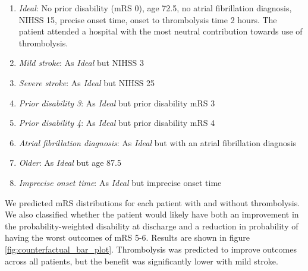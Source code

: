 \begin{enumerate}
    \item \textit{Ideal}: No prior disability (mRS 0), age 72.5, no atrial fibrillation diagnosis, NIHSS 15, precise onset time, onset to thrombolysis time 2 hours. The patient attended a hospital with the most neutral contribution towards use of thrombolysis.
    \item \textit{Mild stroke}: As \textit{Ideal} but NIHSS 3
    \item \textit{Severe stroke}: As \textit{Ideal} but NIHSS 25
    \item \textit{Prior disability 3}: As \textit{Ideal} but prior disability mRS 3
    \item \textit{Prior disability 4}:  As \textit{Ideal} but prior disability mRS 4
    \item \textit{Atrial fibrillation diagnosis}: As \textit{Ideal} but with an atrial fibrillation diagnosis
    \item \textit{Older}: As \textit{Ideal} but age 87.5
    \item \textit{Imprecise onset time}: As \textit{Ideal} but imprecise onset time
\end{enumerate}

We predicted mRS distributions for each patient with and without thrombolysis. We also classified whether the patient would likely have both an improvement in the probability-weighted disability at discharge and a reduction in probability of having the worst outcomes of mRS 5-6. Results are shown in figure \ref{fig:counterfactual_bar_plot}. Thrombolysis was predicted to improve outcomes across all patients, but the benefit was significantly lower with mild stroke.


